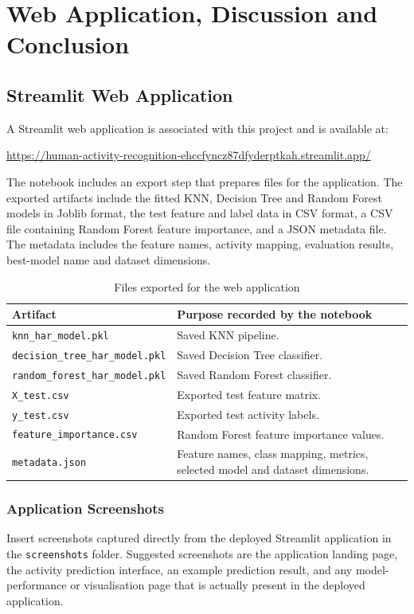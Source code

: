 \chapter{Web Application, Discussion and Conclusion}
\section{Streamlit Web Application}
A Streamlit web application is associated with this project and is available at:
\begin{center}
\url{https://human-activity-recognition-ehccfyncz87dfyderptkah.streamlit.app/}
\end{center}

The notebook includes an export step that prepares files for the application. The exported artifacts include the fitted KNN, Decision Tree and Random Forest models in Joblib format, the test feature and label data in CSV format, a CSV file containing Random Forest feature importance, and a JSON metadata file. The metadata includes the feature names, activity mapping, evaluation results, best-model name and dataset dimensions.

\begin{table}[H]\centering
\caption{Files exported for the web application}
\begin{tabular}{lp{8.2cm}}
\toprule
\textbf{Artifact} & \textbf{Purpose recorded by the notebook}\\
\midrule
\texttt{knn\_har\_model.pkl} & Saved KNN pipeline.\\
\texttt{decision\_tree\_har\_model.pkl} & Saved Decision Tree classifier.\\
\texttt{random\_forest\_har\_model.pkl} & Saved Random Forest classifier.\\
\texttt{X\_test.csv} & Exported test feature matrix.\\
\texttt{y\_test.csv} & Exported test activity labels.\\
\texttt{feature\_importance.csv} & Random Forest feature importance values.\\
\texttt{metadata.json} & Feature names, class mapping, metrics, selected model and dataset dimensions.\\
\bottomrule
\end{tabular}
\end{table}

\subsection{Application Screenshots}
Insert screenshots captured directly from the deployed Streamlit application in the \texttt{screenshots} folder. Suggested screenshots are the application landing page, the activity prediction interface, an example prediction result, and any model-performance or visualisation page that is actually present in the deployed application.

